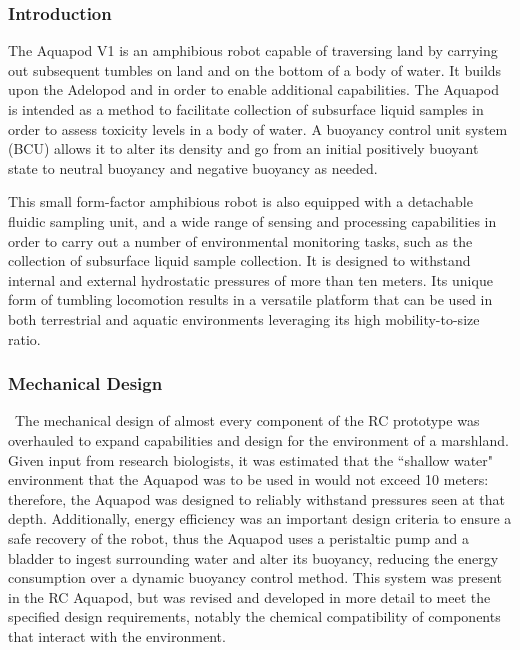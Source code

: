 \subsubsection{Introduction}

The Aquapod V1 is an amphibious robot capable of traversing land by carrying out subsequent tumbles on land and on the bottom of a body of water. It builds upon the Adelopod \cite{Hemes2009} and \cite{Carlson2011} in order to enable additional capabilities. The Aquapod is intended as a method to facilitate collection of subsurface liquid samples in order to assess toxicity levels in a body of water. A buoyancy control unit system (BCU) allows it to alter its density and go from an initial positively buoyant state to neutral buoyancy and negative buoyancy as needed.

This small form-factor amphibious robot is also equipped with a detachable fluidic sampling unit, and a wide range of sensing and processing capabilities in order to carry out a number of environmental monitoring tasks, such as the collection of subsurface liquid sample collection.  It is designed to withstand internal and external hydrostatic pressures of more than ten meters. Its unique form of tumbling locomotion results in a versatile platform that can be used in both terrestrial and aquatic environments leveraging its high mobility-to-size ratio.


\subsubsection{Mechanical Design}\
The mechanical design of almost every component of the RC prototype was overhauled to expand capabilities and design for the environment of a marshland. Given input from research biologists, it was estimated that the ``shallow water" environment that the Aquapod was to be used in would not exceed 10 meters: therefore, the Aquapod was designed to reliably withstand pressures seen at that depth.  Additionally, energy efficiency was an important design criteria to ensure a safe recovery of the robot, thus the Aquapod uses a peristaltic pump and a bladder to ingest surrounding water and alter its buoyancy, reducing the energy consumption over a dynamic buoyancy control method.  This system was present in the RC Aquapod, but was revised and developed in more detail to meet the specified design requirements, notably the chemical compatibility of components that interact with the environment.  

